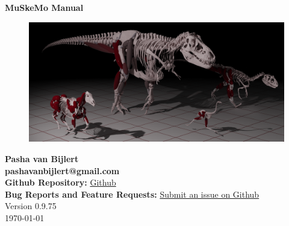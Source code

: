 \documentclass{article}
\begin{document}











\begin{center}
    {\huge \textbf{MuSkeMo Manual}}\\[20pt]  %
    \vspace{10pt}  %

    \begin{figure}[h]
        \centering
        \includegraphics[width=\textwidth]{figures/cover_pic.png} %
    \end{figure}
    \setcounter{figure}{0}
    \vspace{20pt} %
    
    {\Large \textbf{Pasha van Bijlert}}\\
    \vspace{10pt}
    \textbf{pashavanbijlert@gmail.com}\\
    \textbf{Github Repository:} \href{https://github.com/PashavanBijlert/MuSkeMo}{Github} \\
    \textbf{Bug Reports and Feature Requests:} \href{https://github.com/PashavanBijlert/MuSkeMo/issues}{Submit an issue on Github} \\
    \vspace{20pt}
    {\large Version 0.9.75} \\
    {\large \today}
\end{center}
\end{document}
